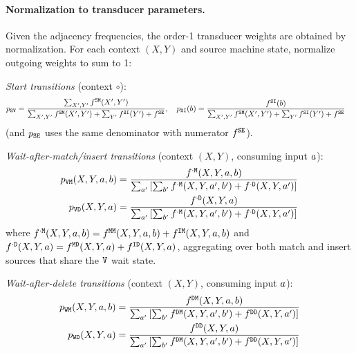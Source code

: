 \paragraph{Normalization to transducer parameters.}
Given the adjacency frequencies, the order-1 transducer weights are obtained by normalization.
For each context $(X,Y)$ and source machine state, normalize outgoing weights to sum to 1:

\medskip
\noindent\emph{Start transitions} (context $\circ$):
\begin{align*}
p_{{\tt S}{\tt V}} &= \frac{\sum_{X',Y'} f^{{\tt S}{\tt M}}(X',Y')}
  {\sum_{X',Y'} f^{{\tt S}{\tt M}}(X',Y') + \sum_{Y'} f^{{\tt S}{\tt I}}(Y') + f^{{\tt S}{\tt E}}}, \quad
p_{{\tt S}{\tt I}}(b) = \frac{f^{{\tt S}{\tt I}}(b)}
  {\sum_{X',Y'} f^{{\tt S}{\tt M}}(X',Y') + \sum_{Y'} f^{{\tt S}{\tt I}}(Y') + f^{{\tt S}{\tt E}}}
\end{align*}
(and $p_{{\tt S}{\tt E}}$ uses the same denominator with numerator $f^{{\tt S}{\tt E}}$).

\medskip
\noindent\emph{Wait-after-match/insert transitions} (context $(X,Y)$, consuming input $a$):
\begin{align*}
p_{{\tt V}{\tt M}}(X,Y,a,b) &= \frac{f^{\cdot{\tt M}}(X,Y,a,b)}
  {\sum_{a'}\left[\sum_{b'} f^{\cdot{\tt M}}(X,Y,a',b') + f^{\cdot{\tt D}}(X,Y,a')\right]} \\
p_{{\tt V}{\tt D}}(X,Y,a) &= \frac{f^{\cdot{\tt D}}(X,Y,a)}
  {\sum_{a'}\left[\sum_{b'} f^{\cdot{\tt M}}(X,Y,a',b') + f^{\cdot{\tt D}}(X,Y,a')\right]}
\end{align*}
where $f^{\cdot{\tt M}}(X,Y,a,b) = f^{{\tt M}{\tt M}}(X,Y,a,b) + f^{{\tt I}{\tt M}}(X,Y,a,b)$
and $f^{\cdot{\tt D}}(X,Y,a) = f^{{\tt M}{\tt D}}(X,Y,a) + f^{{\tt I}{\tt D}}(X,Y,a)$,
aggregating over both match and insert sources that share the ${\tt V}$ wait state.

\medskip
\noindent\emph{Wait-after-delete transitions} (context $(X,Y)$, consuming input $a$):
\begin{align*}
p_{{\tt W}{\tt M}}(X,Y,a,b) &= \frac{f^{{\tt D}{\tt M}}(X,Y,a,b)}
  {\sum_{a'}\left[\sum_{b'} f^{{\tt D}{\tt M}}(X,Y,a',b') + f^{{\tt D}{\tt D}}(X,Y,a')\right]} \\
p_{{\tt W}{\tt D}}(X,Y,a) &= \frac{f^{{\tt D}{\tt D}}(X,Y,a)}
  {\sum_{a'}\left[\sum_{b'} f^{{\tt D}{\tt M}}(X,Y,a',b') + f^{{\tt D}{\tt D}}(X,Y,a')\right]}
\end{align*}

